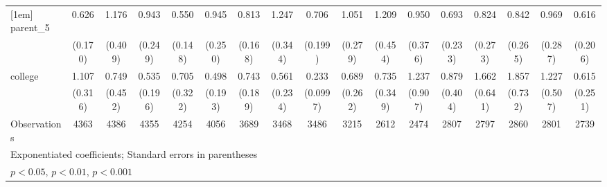 {\begin{tabular}{l*{16}{c}}
[1em]
parent\_5            &       0.626         &       1.176         &       0.943         &       0.550\sym{*}  &       0.945         &       0.813         &       1.247         &       0.706         &       1.051         &       1.209         &       0.950         &       0.693         &       0.824         &       0.842         &       0.969         &       0.616         \\
                    &     (0.170)         &     (0.409)         &     (0.249)         &     (0.148)         &     (0.250)         &     (0.168)         &     (0.344)         &     (0.199)         &     (0.279)         &     (0.454)         &     (0.376)         &     (0.233)         &     (0.273)         &     (0.265)         &     (0.287)         &     (0.206)         \\
[1em]
college             &       1.107         &       0.749         &       0.535         &       0.705         &       0.498         &       0.743         &       0.561         &       0.233\sym{***}&       0.689         &       0.735         &       1.237         &       0.879         &       1.662         &       1.857         &       1.227         &       0.615         \\
                    &     (0.316)         &     (0.452)         &     (0.196)         &     (0.322)         &     (0.193)         &     (0.189)         &     (0.234)         &    (0.0997)         &     (0.262)         &     (0.349)         &     (0.907)         &     (0.404)         &     (0.641)         &     (0.732)         &     (0.507)         &     (0.251)         \\
\hline
Observations        &        4363         &        4386         &        4355         &        4254         &        4056         &        3689         &        3468         &        3486         &        3215         &        2612         &        2474         &        2807         &        2797         &        2860         &        2801         &        2739         \\
\hline\hline
\multicolumn{17}{l}{\footnotesize Exponentiated coefficients; Standard errors in parentheses}\\
\multicolumn{17}{l}{\footnotesize \sym{*} \(p<0.05\), \sym{**} \(p<0.01\), \sym{***} \(p<0.001\)}\\
\end{tabular}
}
